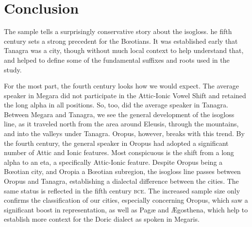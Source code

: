 \section{Conclusion}

The sample tells a surprisingly conservative story about the  isogloss. 
he fifth century  sets a strong precedent for the Bœotians.
It was established early that Tanagra was a  city,
though without much local context to help understand that,
and helped to define some of the fundamental suffixes and roots used in the study. 

For the most part,
the fourth century  looks how we would expect.
The average speaker in Megara did not participate in the Attic-Ionic Vowel Shift
and retained the long alpha in all positions.
So,
too,
did the average speaker in Tanagra. Between Megara and Tanagra,
we see the general development of the  isogloss line,
as it traveled north from the area around Eleusis,
through the mountains,
and into the valleys under Tanagra.
Oropus,
however,
breaks with this trend.
By the fourth century,
the general speaker in Oropus had adopted a significant number of Attic and Ionic features.
Most conspicuous is the shift from a long alpha to an eta,
a specifically Attic-Ionic feature.
Despite Oropus being a Bœotian city,
and Oropia a Bœotian subregion,
the  isogloss line passes between Oropus and Tanagra,
establishing a dialectal difference between the cities.
The same status is reflected in the fifth century \textsc{bce}.
The increased sample size only confirms the classification of our cities,
especially concerning Oropus,
which saw a significant boost in representation,
as well as Pagæ and Ægosthena,
which help to establish more context for the Doric dialect as spoken in Megaris.
